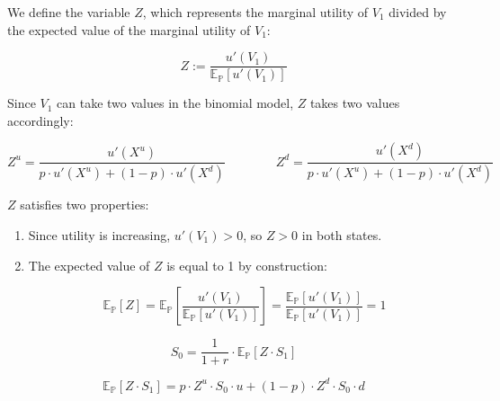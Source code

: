 \documentclass[hidelinks, 12pt, a4paper]{article}
\theoremstyle{definition}
\begin{document}
\noindent We define the variable $Z$, which represents the marginal utility of $V_1$ divided by the
expected value of the marginal utility of $V_1$:

\begin{equation}
Z := \frac{u'(V_1)}{\mathbb{E}_{\mathbb{P}}\!\left[u'(V_1)\right]}
\end{equation}


\noindent Since $V_1$ can take two values in the binomial model, 
$Z$ takes two values accordingly:

\begin{equation}
Z^u =
  \frac{u'(X^u)}
       {p \cdot u'(X^u) + (1-p) \cdot u'(X^d)}
\qquad\qquad
Z^d =
  \frac{u'(X^d)}
       {p \cdot u'(X^u) + (1-p) \cdot u'(X^d)}
\end{equation}

\smallbreak

\noindent $Z$ satisfies two properties:

\begin{enumerate}
  \item Since utility is increasing, $u'(V_1) > 0$, so $Z > 0$ 
        in both states.

  \vspace{0.2em}

  \item The expected value of $Z$ is equal to 1 by construction:

        \begin{equation}
        \mathbb{E}_{\mathbb{P}}[Z]
          = \mathbb{E}_{\mathbb{P}}\!\left[
          \frac{u'(V_1)}{\mathbb{E}_{\mathbb{P}}\!\left[u'(V_1)\right]}
          \right]
          = \frac{\mathbb{E}_{\mathbb{P}}\!\left[u'(V_1)\right]}
                 {\mathbb{E}_{\mathbb{P}}\!\left[u'(V_1)\right]}
          = 1
        \end{equation}
\end{enumerate}



\begin{equation}
S_0 = \frac{1}{1+r} \cdot 
\mathbb{E}_{\mathbb{P}}\!\left[Z \cdot S_1\right]
\end{equation}


\begin{equation}
\mathbb{E}_{\mathbb{P}}\!\left[Z \cdot S_1\right] 
  = p \cdot Z^u \cdot S_0 \cdot u 
  + (1-p) \cdot Z^d \cdot S_0 \cdot d
\end{equation}
\end{document}
